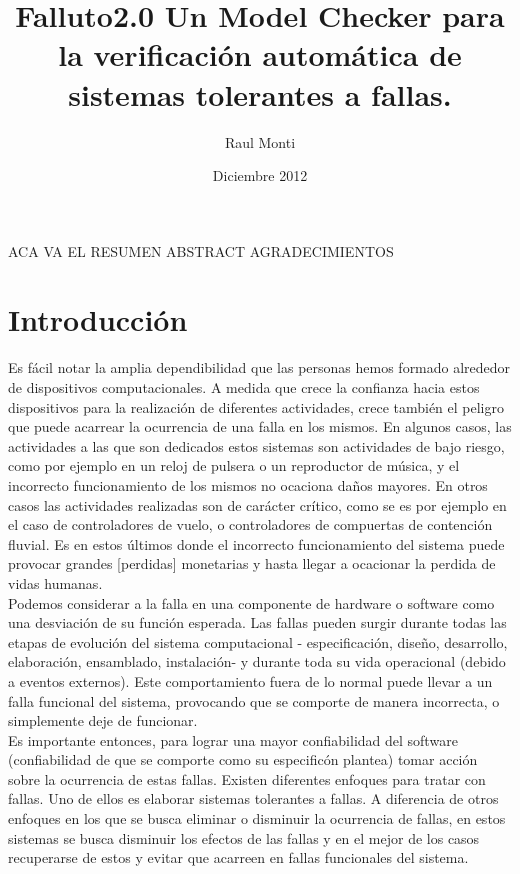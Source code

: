 \documentclass[titlepage, 12pt]{book}
\title{Falluto2.0 Un Model Checker para la verificaci\'on autom\'atica de sistemas tolerantes a fallas.}
\author{Raul Monti}
\date{Diciembre 2012}
\begin{document}
\maketitle

\newpage
ACA VA EL RESUMEN
\newpage
ABSTRACT
\newpage
AGRADECIMIENTOS

\newpage
\tableofcontents

\newpage
\chapter{Introducci\'on}
\label{introduccion}

Es f\'acil notar la amplia dependibilidad que las personas hemos formado alrededor de dispositivos computacionales. A medida que crece la confianza hacia estos dispositivos para la realizaci\'on de diferentes actividades, crece tambi\'en el peligro que puede acarrear la ocurrencia de una falla en los mismos. En algunos casos, las actividades a las que son dedicados estos sistemas son actividades de bajo riesgo, como por ejemplo en un reloj de pulsera o un reproductor de m\'usica, y el incorrecto funcionamiento de los mismos no ocaciona da\~nos mayores. En otros casos las actividades realizadas son de car\'acter cr\'itico, como se es por ejemplo en el caso de controladores de vuelo, o controladores de compuertas de contenci\'on fluvial. Es en estos \'ultimos donde el incorrecto funcionamiento del sistema puede provocar grandes [perdidas] monetarias y hasta llegar a ocacionar la perdida de vidas humanas.\\

Podemos considerar a la falla en una componente de hardware o software como una desviaci\'on de su funci\'on esperada. Las fallas pueden surgir durante todas las etapas de evoluci\'on del sistema computacional - especificaci\'on, dise\~no, desarrollo, elaboraci\'on, ensamblado, instalaci\'on- y durante toda su vida operacional\cite{faultInjection} (debido a eventos externos). Este comportamiento fuera de lo normal puede llevar a un falla funcional del sistema, provocando que se comporte de manera incorrecta, o simplemente deje de funcionar.\\
Es importante entonces, para lograr una mayor confiabilidad del software (confiabilidad de que se comporte como su especific\'on plantea) tomar acci\'on sobre la ocurrencia de estas fallas. Existen diferentes enfoques para tratar con fallas. Uno de ellos es elaborar sistemas tolerantes a fallas. A diferencia de otros enfoques en los que se busca eliminar o disminuir la ocurrencia de fallas, en estos sistemas se busca disminuir los efectos de las fallas y en el mejor de los casos recuperarse de estos y evitar que acarreen en fallas funcionales del sistema.\\
\end{document}

